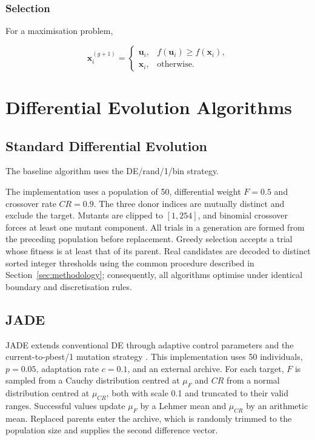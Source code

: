 \documentclass[review]{elsarticle}
\begin{document}
\subsubsection{Selection}

For a maximisation problem,

\begin{equation}
\mathbf{x}_{i}^{(g+1)}
=
\begin{cases}
\mathbf{u}_{i},
& f(\mathbf{u}_{i}) \geq f(\mathbf{x}_{i}),\\

\mathbf{x}_{i},
& \text{otherwise}.
\end{cases}
\end{equation}





\section{Differential Evolution Algorithms}
\label{sec:algorithms}


\subsection{Standard Differential Evolution}

The baseline algorithm uses the DE/rand/1/bin strategy.

The implementation uses a population of 50, differential weight $F=0.5$
and crossover rate $CR=0.9$. The three donor indices are mutually distinct
and exclude the target. Mutants are clipped to $[1,254]$, and binomial
crossover forces at least one mutant component. All trials in a generation
are formed from the preceding population before replacement. Greedy
selection accepts a trial whose fitness is at least that of its parent.
Real candidates are decoded to distinct sorted integer thresholds using the
common procedure described in Section~\ref{sec:methodology}; consequently,
all algorithms optimise under identical boundary and discretisation rules.


\subsection{JADE}

JADE extends conventional DE through adaptive control parameters and
the current-to-$p$best/1 mutation strategy \citep{zhang2009jade}. This
implementation uses 50 individuals, $p=0.05$, adaptation rate $c=0.1$, and
an external archive. For each target, $F$ is sampled from a Cauchy
distribution centred at $\mu_F$ and $CR$ from a normal distribution centred
at $\mu_{CR}$, both with scale 0.1 and truncated to their valid ranges.
Successful values update $\mu_F$ by a Lehmer mean and $\mu_{CR}$ by an
arithmetic mean. Replaced parents enter the archive, which is randomly
trimmed to the population size and supplies the second difference vector.
\end{document}
